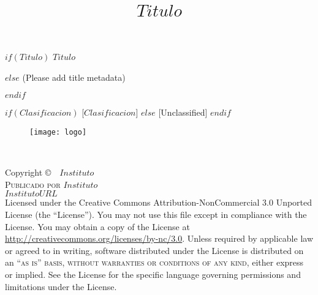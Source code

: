 \documentclass[11pt,fleqn]{book} %
\title{$Titulo$}
\begin{document}

\begingroup
\thispagestyle{empty}
\centering
\vspace*{9cm}
\par\normalfont\fontsize{35}{35}\sffamily\selectfont
$if(Titulo)$
$Titulo$\par %
$else$
(Please add title metadata)\par %
$endif$

\par\normalfont\fontsize{22}{22}\sffamily\selectfont
$if(Clasificacion)$
[$Clasificacion$]
$else$
[Unclassified]
$endif$

\vspace*{1cm}

\begin{figure}[h]
  \centering
    \texttt{[image: logo]}
\end{figure}

\endgroup


\newpage
~\vfill
\thispagestyle{empty}

\noindent Copyright \copyright\ \the\year \ $Instituto$\\ %

\noindent \textsc{Publicado por $Instituto$}\\ %

\noindent \textsc{$InstitutoURL$}\\ %

\noindent Licensed under the Creative Commons Attribution-NonCommercial 3.0 Unported License (the ``License''). You may not use this file except in compliance with the License. You may obtain a copy of the License at \url{http://creativecommons.org/licenses/by-nc/3.0}. Unless required by applicable law or agreed to in writing, software distributed under the License is distributed on an \textsc{``as is'' basis, without warranties or conditions of any kind}, either express or implied. See the License for the specific language governing permissions and limitations under the License.\\ %
\end{document}
